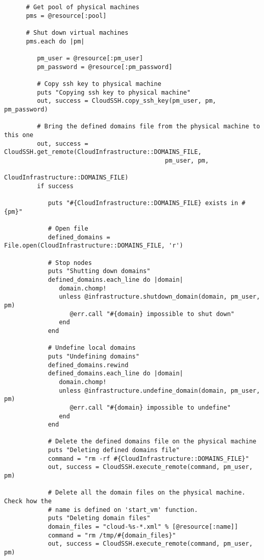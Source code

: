 \begin{lstlisting}
      # Get pool of physical machines
      pms = @resource[:pool]
      
      # Shut down virtual machines
      pms.each do |pm|
      
         pm_user = @resource[:pm_user]
         pm_password = @resource[:pm_password]
         
         # Copy ssh key to physical machine
         puts "Copying ssh key to physical machine"
         out, success = CloudSSH.copy_ssh_key(pm_user, pm, pm_password)
         
         # Bring the defined domains file from the physical machine to this one
         out, success = CloudSSH.get_remote(CloudInfrastructure::DOMAINS_FILE,
                                            pm_user, pm,
                                            CloudInfrastructure::DOMAINS_FILE)
         if success
         
            puts "#{CloudInfrastructure::DOMAINS_FILE} exists in #{pm}"
            
            # Open file
            defined_domains = File.open(CloudInfrastructure::DOMAINS_FILE, 'r')
         
            # Stop nodes
            puts "Shutting down domains"
            defined_domains.each_line do |domain|
               domain.chomp!
               unless @infrastructure.shutdown_domain(domain, pm_user, pm)
                  @err.call "#{domain} impossible to shut down"
               end
            end
            
            # Undefine local domains
            puts "Undefining domains"
            defined_domains.rewind
            defined_domains.each_line do |domain|
               domain.chomp!
               unless @infrastructure.undefine_domain(domain, pm_user, pm)
                  @err.call "#{domain} impossible to undefine"
               end
            end
            
            # Delete the defined domains file on the physical machine
            puts "Deleting defined domains file"
            command = "rm -rf #{CloudInfrastructure::DOMAINS_FILE}"
            out, success = CloudSSH.execute_remote(command, pm_user, pm)
            
            # Delete all the domain files on the physical machine. Check how the
            # name is defined on 'start_vm' function.
            puts "Deleting domain files"
            domain_files = "cloud-%s-*.xml" % [@resource[:name]]
            command = "rm /tmp/#{domain_files}"
            out, success = CloudSSH.execute_remote(command, pm_user, pm)
         

\end{lstlisting}
